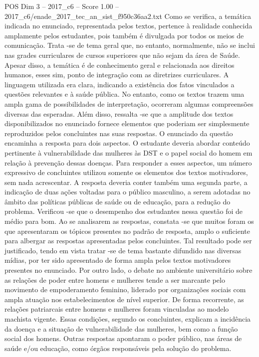 \begin{textsample}{POS Dim 3 – 2017\_c6 – Score 1.00 – 2017\_c6/enade\_2017\_tec\_an\_sist\_f950c36aa2.txt}
Como se verifica, a temática indicada no enunciado, representada pelos textos, pertence à realidade conhecida amplamente pelos estudantes, pois também é divulgada por todos os meios de comunicação.
Trata -se de tema geral que, no entanto, normalmente, não se inclui nas grades curriculares de cursos superiores que não sejam da área de Saúde.
Apesar disso, a temática é de conhecimento geral e relacionada aos direitos humanos, esses sim, ponto de integração com as diretrizes curriculares.
A linguagem utilizada era clara, indicando a existência dos fatos vinculados a questões relevantes e à saúde pública.
No entanto, como os textos trazem uma ampla gama de possibilidades de interpretação, ocorreram algumas compreensões diversas das esperadas.
Além disso, ressalta -se que a amplitude dos textos disponibilizados no enunciado fornece elementos que poderiam ser simplesmente reproduzidos pelos concluintes nas suas respostas.
O enunciado da questão encaminha a resposta para dois aspectos.
O estudante deveria abordar conteúdo pertinente à vulnerabilidade das mulheres às DST e o papel social do homem em relação à prevenção dessas doenças.
Para responder a esses aspectos, um número expressivo de concluintes utilizou somente os elementos dos textos motivadores, sem nada acrescentar.
A resposta deveria conter também uma segunda parte, a indicação de duas ações voltadas para o público masculino, a serem adotadas no âmbito das políticas públicas de saúde ou de educação, para a redução do problema.
Verificou -se que o desempenho dos estudantes nessa questão foi de médio para bom.
Ao se analisarem as respostas, constata -se que muitos foram os que apresentaram os tópicos presentes no padrão de resposta, amplo o suficiente para albergar as respostas apresentadas pelos concluintes.
Tal resultado pode ser justificado, tendo em vista tratar -se de tema bastante difundido nas diversas mídias, por ter sido apresentado de forma ampla pelos textos motivadores presentes no enunciado.
Por outro lado, o debate no ambiente universitário sobre as relações de poder entre homens e mulheres tende a ser marcante pelo movimento de empoderamento feminino, liderado por organizações sociais com ampla atuação nos estabelecimentos de nível superior.
De forma recorrente, as relações patriarcais entre homens e mulheres foram vinculadas ao modelo machista vigente.
Essas condições, segundo os concluintes, explicam a incidência da doença e a situação de vulnerabilidade das mulheres, bem como a função social dos homens.
Outras respostas apontaram o poder público, nas áreas de saúde e/ou educação, como órgãos responsáveis pela solução do problema.

\end{textsample}
